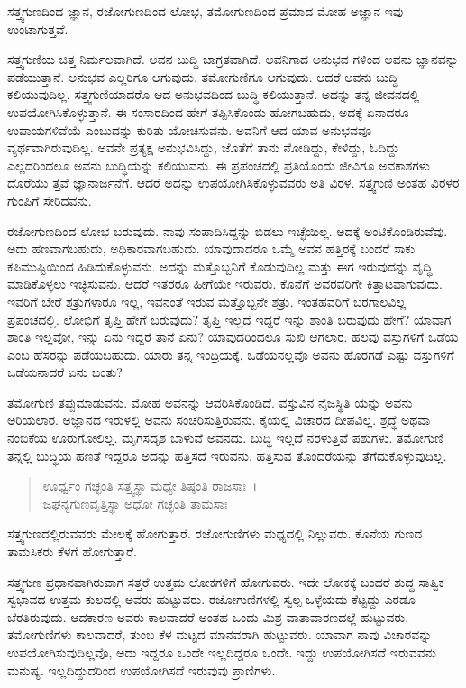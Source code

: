 {\small ಸತ್ತ್ವಗುಣದಿಂದ ಜ್ಞಾನ, ರಜೋಗುಣದಿಂದ ಲೋಭ, ತಮೋಗುಣದಿಂದ ಪ್ರಮಾದ ಮೋಹ ಅಜ್ಞಾನ ಇವು ಉಂಟಾಗುತ್ತವೆ.}

ಸತ್ತ್ವಗುಣಿಯ ಚಿತ್ತ ನಿರ್ಮಲವಾಗಿದೆ. ಅವನ ಬುದ್ಧಿ ಜಾಗ್ರತವಾಗಿದೆ. ಅವನಿಗಾದ ಅನುಭವ ಗಳಿಂದ ಅವನು ಜ್ಞಾನವನ್ನು ಪಡೆಯುತ್ತಾನೆ. ಅನುಭವ ಎಲ್ಲರಿಗೂ ಆಗುವುದು. ತಮೋಗುಣಿಗೂ ಆಗುವುದು. ಆದರೆ ಅವನು ಬುದ್ಧಿ ಕಲಿಯುವುದಿಲ್ಲ. ಸತ್ತ್ವಗುಣಿಯಾದರೊ ಆದ ಅನುಭವದಿಂದ ಬುದ್ಧಿ ಕಲಿಯುತ್ತಾನೆ. ಅದನ್ನು ತನ್ನ ಜೀವನದಲ್ಲಿ ಉಪಯೋಗಿಸಿಕೊಳ್ಳುತ್ತಾನೆ. ಈ ಸಂಸಾರದಿಂದ ಹೇಗೆ ತಪ್ಪಿಸಿಕೊಂಡು ಹೋಗಬಹುದು, ಅದಕ್ಕೆ ಏನಾದರೂ ಉಪಾಯಗಳಿವೆಯೆ ಎಂಬುದನ್ನು ಕುರಿತು ಯೋಚಿಸುವನು. ಅವನಿಗೆ ಆದ ಯಾವ ಅನುಭವವೂ ವ್ಯರ್ಥವಾಗಿರುವುದಿಲ್ಲ. ಅವನೇ ಪ್ರತ್ಯಕ್ಷ ಅನುಭವಿಸಿದ್ದು, ಜೊತೆಗೆ ತಾನು ನೋಡಿದ್ದು, ಕೇಳಿದ್ದು, ಓದಿದ್ದು ಎಲ್ಲದರಿಂದಲೂ ಅವನು ಬುದ್ಧಿಯನ್ನು ಕಲಿಯುವನು. ಈ ಪ್ರಪಂಚದಲ್ಲಿ ಪ್ರತಿಯೊಂದು ಜೀವಿಗೂ ಅವಕಾಶಗಳು ದೊರೆಯು ತ್ತವೆ ಜ್ಞಾನಾರ್ಜನೆಗೆ. ಆದರೆ ಅದನ್ನು ಉಪಯೋಗಿಸಿಕೊಳ್ಳುವವರು ಅತಿ ವಿರಳ. ಸತ್ತ್ವಗುಣಿ ಅಂತಹ ವಿರಳರ ಗುಂಪಿಗೆ ಸೇರಿದವನು.

ರಜೋಗುಣದಿಂದ ಲೋಭ ಬರುವುದು. ನಾವು ಸಂಪಾದಿಸಿದ್ದನ್ನು ಬಿಡಲು ಇಚ್ಛೆಯಿಲ್ಲ. ಅದಕ್ಕೆ ಅಂಟಿಕೊಂಡಿರುವೆವು. ಅದು ಹಣವಾಗಬಹುದು, ಅಧಿಕಾರವಾಗಬಹುದು. ಯಾವುದಾದರೂ ಒಮ್ಮೆ ಅವನ ಹತ್ತಿರಕ್ಕೆ ಬಂದರೆ ಸಾಕು ಕಪಿಮುಷ್ಟಿಯಿಂದ ಹಿಡಿದುಕೊಳ್ಳುವನು. ಅದನ್ನು ಮತ್ತೊಬ್ಬನಿಗೆ ಕೊಡುವುದಿಲ್ಲ ಮತ್ತು ಈಗ ಇರುವುದನ್ನು ವೃದ್ಧಿ ಮಾಡಿಕೊಳ್ಳಲು ಇಚ್ಛಿಸುವನು. ಆದರೆ ಇತರರೂ ಹೀಗೆಯೇ ಇರುವರು. ಕೊನೆಗೆ ಅವರವರಿಗೇ ಕಿತ್ತಾಟವಾಗುವುದು. ಇವರಿಗೆ ಬೇರೆ ಶತ್ರುಗಳಾರೂ ಇಲ್ಲ, ಇವನಂತೆ ಇರುವ ಮತ್ತೊಬ್ಬನೇ ಶತ್ರು. ಇಂತಹವರಿಗೆ ಬರಗಾಲವಿಲ್ಲ ಪ್ರಪಂಚದಲ್ಲಿ. ಲೋಭಿಗೆ ತೃಪ್ತಿ ಹೇಗೆ ಬರುವುದು? ತೃಪ್ತಿ ಇಲ್ಲದೆ ಇದ್ದರೆ ಇನ್ನು ಶಾಂತಿ ಬರುವುದು ಹೇಗೆ? ಯಾವಾಗ ಶಾಂತಿ ಇಲ್ಲವೋ, ಇನ್ನು ಏನು ಇದ್ದರೆ ತಾನೆ ಏನು? ಯಾವುದರಿಂದಲೂ ಸುಖಿ ಆಗಲಾರ. ಹಲವು ವಸ್ತುಗಳಿಗೆ ಒಡೆಯ ಎಂಬ ಹೆಸರನ್ನು ಪಡೆಯಬಹುದು. ಯಾರು ತನ್ನ ಇಂದ್ರಿಯಕ್ಕೆ, ಒಡೆಯನಲ್ಲವೊ ಅವನು ಹೊರಗಡೆ ಎಷ್ಟು ವಸ್ತುಗಳಿಗೆ ಒಡೆಯನಾದರೆ ಏನು ಬಂತು?

ತಮೋಗುಣಿ ತಪ್ಪುಮಾಡುವನು. ಮೋಹ ಅವನನ್ನು ಆವರಿಸಿಕೊಂಡಿದೆ. ವಸ್ತುವಿನ ನೈಜಸ್ಥಿತಿ ಯನ್ನು ಅವನು ಅರಿಯಲಾರ. ಅಜ್ಞಾನದ ಇರುಳಲ್ಲಿ ಅವನು ಸಂಚರಿಸುತ್ತಿರುವನು. ಕೈಯಲ್ಲಿ ವಿಚಾರದ ದೀಪವಿಲ್ಲ. ಶ್ರದ್ಧೆ ಅಥವಾ ನಂಬಿಕೆಯ ಊರುಗೋಲಿಲ್ಲ. ಮೃಗಸದೃಶ ಬಾಳುವೆ ಅವನದು. ಬುದ್ಧಿ ಇಲ್ಲದೆ ನರಳುತ್ತಿವೆ ಪಶುಗಳು. ತಮೋಗುಣಿ ತನ್ನಲ್ಲಿ ಬುದ್ಧಿಯ ಹಣತೆ ಇದ್ದರೂ ಅದನ್ನು ಹತ್ತಿಸದೆ ಇರುವನು. ಹತ್ತಿಸುವ ತೊಂದರೆಯನ್ನು ತೆಗೆದುಕೊಳ್ಳುವುದಿಲ್ಲ.

\begin{verse}
ಊರ್ಧ್ವಂ ಗಚ್ಛಂತಿ ಸತ್ತ್ವಸ್ಥಾ ಮಧ್ಯೇ ತಿಷ್ಠಂತಿ ರಾಜಸಾಃ~।\\ಜಘನ್ಯಗುಣವೃತ್ತಿಸ್ಥಾ ಅಧೋ ಗಚ್ಛಂತಿ ತಾಮಸಾಃ 
\end{verse}

{\small ಸತ್ತ್ವಗುಣದಲ್ಲಿರುವವರು ಮೇಲಕ್ಕೆ ಹೋಗುತ್ತಾರೆ. ರಜೋಗುಣಿಗಳು ಮಧ್ಯದಲ್ಲಿ ನಿಲ್ಲುವರು. ಕೊನೆಯ ಗುಣದ ತಾಮಸಿಕರು ಕೆಳಗೆ ಹೋಗುತ್ತಾರೆ.}

ಸತ್ತ್ವಗುಣ ಪ್ರಧಾನವಾಗಿರುವಾಗ ಸತ್ತರೆ ಉತ್ತಮ ಲೋಕಗಳಿಗೆ ಹೋಗುವರು. ಇದೇ ಲೋಕಕ್ಕೆ ಬಂದರೆ ಶುದ್ಧ ಸಾತ್ವಿಕ ಸ್ವಭಾವದ ಉತ್ತಮ ಕುಲದಲ್ಲಿ ಅವರು ಹುಟ್ಟುವರು. ರಜೋಗುಣಿಗಳಲ್ಲಿ ಸ್ವಲ್ಪ ಒಳ್ಳೆಯದು ಕೆಟ್ಟದ್ದು ಎರಡೂ ಬೆರತಿರುವುದು. ಆದಕಾರಣ ಅವರು ಕಾಲವಾದರೆ ಅಂತಹ ಒಂದು ಮಿಶ್ರ ವಾತಾವಾರಣದಲ್ಲೆ ಹುಟ್ಟುವರು. ತಮೋಗುಣಿಗಳು ಕಾಲವಾದರೆ, ತುಂಬ ಕೆಳ ಮಟ್ಟದ ಮಾನವರಾಗಿ ಹುಟ್ಟುವರು. ಯಾವಾಗ ನಾವು ವಿಚಾರವನ್ನು ಉಪಯೋಗಿಸುವುದಿಲ್ಲವೊ, ಅದು ಇದ್ದರೂ ಒಂದೇ ಇಲ್ಲದಿದ್ದರೂ ಒಂದೇ. ಇದ್ದು ಉಪಯೋಗಿಸದೆ ಇರುವವನು ಮನುಷ್ಯ. ಇಲ್ಲದಿದ್ದುದರಿಂದ ಉಪಯೋಗಿಸದೆ ಇರುವುವು ಪ್ರಾಣಿಗಳು.


